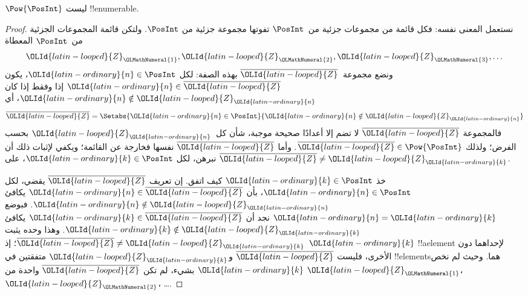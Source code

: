 \documentclass[../../../include/open-logic-section]{subfiles}
\begin{document}
\begin{thm}
$\Pow{\PosInt}$ ليست !!{enumerable}.
\end{thm}

\begin{proof}
نستعمل المعنى نفسه: فكل قائمة من مجموعات جزئية من~$\PosInt$ تفوتها مجموعة جزئية من $\PosInt$. ولتكن قائمة المجموعات الجزئية من~$\PosInt$ المعطاة
\[
{\OLId{latin-looped}{Z}}_{{\OLMathNumeral{1}}}, {\OLId{latin-looped}{Z}}_{{\OLMathNumeral{2}}}, {\OLId{latin-looped}{Z}}_{{\OLMathNumeral{3}}}, \dots
\]
ونضع مجموعة~$\overline{{\OLId{latin-looped}{Z}}}$ بهذه الصفة: لكل ${\OLId{latin-ordinary}{n}} \in \PosInt$، يكون ${\OLId{latin-ordinary}{n}} \in \overline{{\OLId{latin-looped}{Z}}}$ إذا وفقط إذا كان ${\OLId{latin-ordinary}{n}} \notin {\OLId{latin-looped}{Z}}_{{\OLId{latin-ordinary}{n}}}$، أي
\[
\overline{{\OLId{latin-looped}{Z}}} = \Setabs{{\OLId{latin-ordinary}{n}} \in \PosInt}{{\OLId{latin-ordinary}{n}} \notin {\OLId{latin-looped}{Z}}_{\OLId{latin-ordinary}{n}}}
\]
فالمجموعة $\overline{{\OLId{latin-looped}{Z}}}$ لا تضم إلا أعدادًا صحيحة موجبة، شأن كل~${\OLId{latin-looped}{Z}}_{\OLId{latin-ordinary}{n}}$ بحسب الفرض؛ ولذلك $\overline{{\OLId{latin-looped}{Z}}} \in
\Pow{\PosInt}$. وأما $\overline{{\OLId{latin-looped}{Z}}}$ نفسها فخارجة عن القائمة؛ ويكفي لإثبات ذلك أن نبرهن، لكل ${\OLId{latin-ordinary}{k}} \in \PosInt$، على $\overline{{\OLId{latin-looped}{Z}}} \neq
{\OLId{latin-looped}{Z}}_{\OLId{latin-ordinary}{k}}$.

خذ ${\OLId{latin-ordinary}{k}} \in \PosInt$ كيف اتفق. إن تعريف $\overline{{\OLId{latin-looped}{Z}}}$ يقضي، لكل ${\OLId{latin-ordinary}{n}} \in \PosInt$، بأن ${\OLId{latin-ordinary}{n}} \in \overline{{\OLId{latin-looped}{Z}}}$ يكافئ ${\OLId{latin-ordinary}{n}} \notin {\OLId{latin-looped}{Z}}_{\OLId{latin-ordinary}{n}}$. فبوضع ${\OLId{latin-ordinary}{n}}={\OLId{latin-ordinary}{k}}$ نجد أن ${\OLId{latin-ordinary}{k}} \in \overline{{\OLId{latin-looped}{Z}}}$ يكافئ ${\OLId{latin-ordinary}{k}} \notin {\OLId{latin-looped}{Z}}_{\OLId{latin-ordinary}{k}}$. وهذا وحده يثبت $\overline{{\OLId{latin-looped}{Z}}} \neq {\OLId{latin-looped}{Z}}_{\OLId{latin-ordinary}{k}}$؛ إذ ${\OLId{latin-ordinary}{k}}$ !!a{element} لإحداهما دون الأخرى، فليست $\overline{{\OLId{latin-looped}{Z}}}$ و${\OLId{latin-looped}{Z}}_{\OLId{latin-ordinary}{k}}$ متفقتين في !!{element}sهما. وحيث لم نخص ${\OLId{latin-ordinary}{k}}$ بشيء، لم تكن $\overline{{\OLId{latin-looped}{Z}}}$ واحدة من ${\OLId{latin-looped}{Z}}_{\OLMathNumeral{1}}$، ${\OLId{latin-looped}{Z}}_{\OLMathNumeral{2}}$، \dots.
\end{proof}
\end{document}
